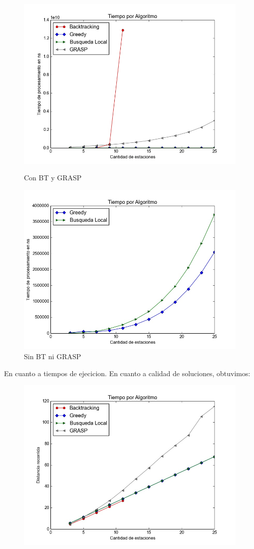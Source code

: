       \begin{figure}[H]
          \includegraphics[width=\linewidth]{imagenes/exp2_ej5_tiempo_con_BT.jpeg}
          \caption{Con BT y GRASP}
        \endminipage\hfill
          \includegraphics[width=\linewidth]{imagenes/exp2_ej5_tiempo_sin_BT_ni_GRASP.jpeg}
          \caption{Sin BT ni GRASP}
        \endminipage
        \end{figure}

        En cuanto a tiempos de ejecicion.
        En cuanto a calidad de soluciones, obtuvimos:


        \begin{figure}[H]
            \begin{center}
              \includegraphics[width=0.7\columnwidth]{imagenes/exp2_ej5_correctitud_solucion.jpeg}
              \caption{}
            \end{center}
        \end{figure}
      
